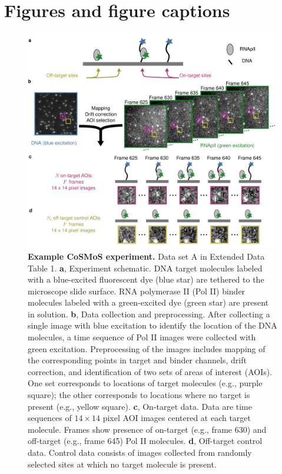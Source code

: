 \clearpage
\newpage
\section*{Figures and figure captions}
\pagebreak

\renewcommand{\figurename}{Fig.}

\begin{figure}[h]
\centering
\includegraphics[width=145mm]{figures/figure1/figure1.png}
\caption{\textbf{Example CoSMoS experiment.} Data set A in Extended Data Table 1. \textbf{a}, Experiment schematic. DNA target molecules labeled with a blue-excited fluorescent dye (blue star) are tethered to the microscope slide surface. RNA polymerase II (Pol II) binder molecules labeled with a green-excited dye (green star) are present in solution. \textbf{b}, Data collection and preprocessing. After collecting a single image with blue excitation to identify the location of the DNA molecules, a time sequence of Pol II images were collected with green excitation.  Preprocessing of the images includes mapping of the corresponding points in target and binder channels, drift correction, and identification of two sets of areas of interest (AOIs).  One set corresponds to locations of target molecules (e.g., purple square); the other corresponds to locations where no target is present (e.g., yellow square). \textbf{c}, On-target data. Data are time sequences of $14 \times 14$ pixel AOI images centered at each target molecule. Frames show presence of on-target (e.g., frame 630) and off-target (e.g., frame 645) Pol II molecules. \textbf{d}, Off-target control data. Control data consists of images collected from randomly selected sites at which no target molecule is present. }
\label{fig:cosmos_experiment}
\end{figure}

